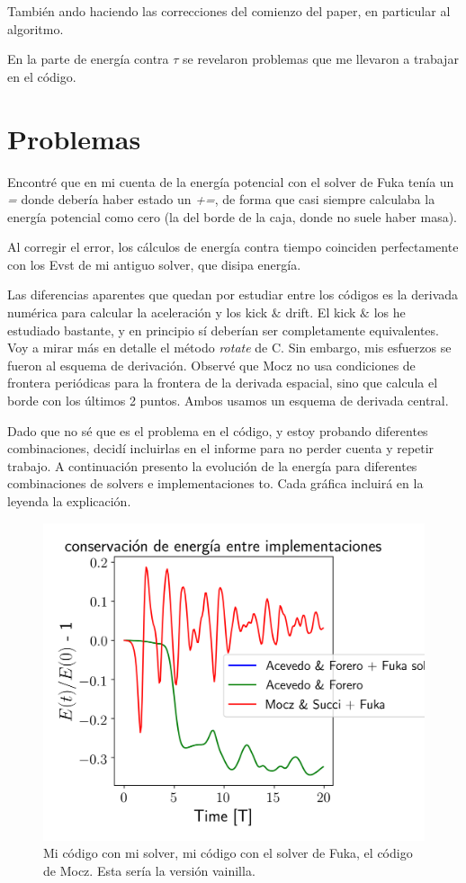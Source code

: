 \documentclass[notitlepage,letterpaper,12pt]{article} %
\begin{document}
También ando haciendo las correcciones del comienzo del paper, en particular al algoritmo.

En la parte de energía contra $\tau$ se revelaron problemas que me llevaron a trabajar en el código.
\section{Problemas}
Encontré que en mi cuenta de la energía potencial con el solver de Fuka tenía un \emph{=} donde debería haber estado un \emph{+=}, de forma que casi siempre calculaba la energía potencial como cero (la del borde de la caja, donde no suele haber masa).

Al corregir el error, los cálculos de energía contra tiempo coinciden perfectamente con los Evst de mi antiguo solver, que disipa energía.

Las diferencias aparentes que quedan por estudiar entre los códigos es la derivada numérica para calcular la aceleración y los kick $\&$ drift.
El kick $\&$ los he estudiado bastante, y en principio sí deberían ser completamente equivalentes.
Voy a mirar más en detalle el método \emph{rotate} de C.
Sin embargo, mis esfuerzos se fueron al esquema de derivación.
Observé que Mocz no usa condiciones de frontera periódicas para la frontera de la derivada espacial, sino que calcula el borde con los últimos 2 puntos.
Ambos usamos un esquema de derivada central.

Dado que no sé que es el problema en el código, y estoy probando diferentes combinaciones, decidí incluirlas en el informe para no perder cuenta y repetir trabajo.
A continuación presento la evolución de la energía para diferentes combinaciones de solvers e implementaciones to.
Cada gráfica incluirá en la leyenda la explicación.


\begin{figure}[h]
  \centering
   \includegraphics[scale= 0.7]{classic_integerLattice.png}
  \caption{Mi código con mi solver, mi código con el solver de Fuka, el código de Mocz. Esta sería la versión vainilla.}
\end{figure}	
\end{document}
